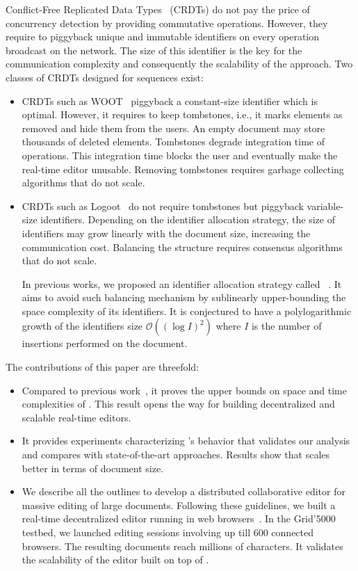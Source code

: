 Conflict-Free Replicated Data Types~\cite{shapiro2011comprehensive} (CRDTs) do
not pay the price of concurrency detection by providing commutative
operations. However, they require to piggyback unique and immutable identifiers
on every operation broadcast on the network. The size of this identifier is the
key for the communication complexity and consequently the scalability of the
approach. Two classes of CRDTs designed for sequences exist:
\begin{itemize}
\item CRDTs such as WOOT~\cite{oster2006data} piggyback a constant-size
  identifier which is optimal. However, it requires to keep tombstones, i.e., it
  marks elements as removed and hide them from the users. An empty document may
  store thousands of deleted elements. Tombstones degrade integration time of
  operations. This integration time blocks the user and eventually make the
  real-time editor unusable. Removing tombstones requires garbage
  collecting algorithms that do not scale.
\item CRDTs such as Logoot~\cite{weiss2010logootundo} do not require tombstones
  but piggyback variable-size identifiers. Depending on the identifier
  allocation strategy, the size of identifiers may grow linearly with the
  document size, increasing the communication cost. Balancing the structure
  requires consensus algorithms that do not scale.

  In previous works, we proposed an identifier allocation strategy called
  \LSEQ~\cite{nedelec2013concurrency, nedelec2013lseq}. It aims to avoid such
  balancing mechanism by sublinearly upper-bounding the space complexity of its
  identifiers. It is conjectured to have a polylogarithmic growth of the
  identifiers size $\mathcal{O}((\log I)^2)$ where $I$ is the number of
  insertions performed on the document.
\end{itemize}

\noindent The contributions of this paper are threefold:
\begin{itemize}
\item Compared to previous work~\cite{nedelec2013concurrency, nedelec2013lseq},
  it proves the upper bounds on space and time complexities of \LSEQ. This result
  opens the way for building decentralized and scalable real-time editors.
\item It provides experiments characterizing \LSEQ's behavior that validates our
  analysis and compares with state-of-the-art approaches. Results show that
  \LSEQ scales better in terms of document size.
\item We describe all the outlines to develop a distributed collaborative editor
  for massive editing of large documents. Following these guidelines, we built a
  real-time decentralized editor running in web
  browsers~\cite{nedelec2016crate}. In the Grid'5000 testbed, we launched
  editing sessions involving up till 600 connected browsers. The resulting
  documents reach millions of characters. It validates the scalability of the
  editor built on top of \LSEQ.
\end{itemize}

